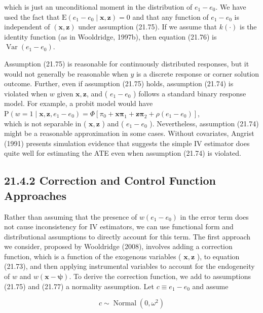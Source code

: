 \documentclass[10pt]{article}
\begin{document}
which is just an unconditional moment in the distribution of $e_{1}-e_{0}$. We have used the fact that $\mathrm{E}\left(e_{1}-e_{0} \mid \mathbf{x}, \mathbf{z}\right)=0$ and that any function of $e_{1}-e_{0}$ is independent of $(\mathbf{x}, \mathbf{z})$ under assumption (21.75). If we assume that $k(\cdot)$ is the identity function (as in Wooldridge, 1997b), then equation (21.76) is $\operatorname{Var}\left(e_{1}-e_{0}\right)$.

Assumption (21.75) is reasonable for continuously distributed responses, but it would not generally be reasonable when $y$ is a discrete response or corner solution outcome. Further, even if assumption (21.75) holds, assumption (21.74) is violated when $w$ given $\mathbf{x}, \mathbf{z}$, and ( $e_{1}-e_{0}$ ) follows a standard binary response model. For example, a probit model would have\\
$\mathrm{P}\left(w=1 \mid \mathbf{x}, \mathbf{z}, e_{1}-e_{0}\right)=\Phi\left[\pi_{0}+\mathbf{x} \boldsymbol{\pi}_{1}+\mathbf{z} \boldsymbol{\pi}_{2}+\rho\left(e_{1}-e_{0}\right)\right]$,\\
which is not separable in ( $\mathbf{x}, \mathbf{z}$ ) and ( $e_{1}-e_{0}$ ). Nevertheless, assumption (21.74) might be a reasonable approximation in some cases. Without covariates, Angrist (1991) presents simulation evidence that suggests the simple IV estimator does quite well for estimating the ATE even when assumption (21.74) is violated.

\subsection*{21.4.2 Correction and Control Function Approaches}
Rather than assuming that the presence of $w\left(e_{1}-e_{0}\right)$ in the error term does not cause inconsistency for IV estimators, we can use functional form and distributional assumptions to directly account for this term. The first approach we consider, proposed by Wooldridge (2008), involves adding a correction function, which is a function of the exogenous variables ( $\mathbf{x}, \mathbf{z}$ ), to equation (21.73), and then applying instrumental variables to account for the endogeneity of $w$ and $w(\mathbf{x}-\boldsymbol{\psi})$. To derive the correction function, we add to assumptions (21.75) and (21.77) a normality assumption. Let $c \equiv e_{1}-e_{0}$ and assume


\begin{equation*}
c \sim \operatorname{Normal}\left(0, \omega^{2}\right) \tag{21.78}
\end{equation*}
\end{document}
